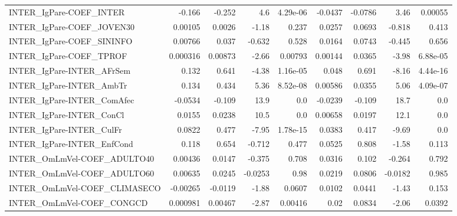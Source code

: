 \begin{tabular}{lrrrrrrrr}
INTER\_IgPare-COEF\_INTER                &      -0.166 &       -0.252 &      4.6 & 4.29e-06 &    -0.0437 &     -0.0786 &         3.46 &       0.00055 \\
INTER\_IgPare-COEF\_JOVEN30              &     0.00105 &       0.0026 &    -1.18 &    0.237 &     0.0257 &      0.0693 &       -0.818 &         0.413 \\
INTER\_IgPare-COEF\_SININFO              &     0.00766 &        0.037 &   -0.632 &    0.528 &     0.0164 &      0.0743 &       -0.445 &         0.656 \\
INTER\_IgPare-COEF\_TPROF                &    0.000316 &      0.00873 &    -2.66 &  0.00793 &    0.00144 &      0.0365 &        -3.98 &      6.88e-05 \\
INTER\_IgPare-INTER\_AFrSem              &       0.132 &        0.641 &    -4.38 & 1.16e-05 &      0.048 &       0.691 &        -8.16 &      4.44e-16 \\
INTER\_IgPare-INTER\_AmbTr               &       0.134 &        0.434 &     5.36 & 8.52e-08 &    0.00586 &      0.0355 &         5.06 &      4.09e-07 \\
INTER\_IgPare-INTER\_ComAfec             &     -0.0534 &       -0.109 &     13.9 &      0.0 &    -0.0239 &      -0.109 &         18.7 &           0.0 \\
INTER\_IgPare-INTER\_ConCl               &      0.0155 &       0.0238 &     10.5 &      0.0 &    0.00658 &      0.0197 &         12.1 &           0.0 \\
INTER\_IgPare-INTER\_CulFr               &      0.0822 &        0.477 &    -7.95 & 1.78e-15 &     0.0383 &       0.417 &        -9.69 &           0.0 \\
INTER\_IgPare-INTER\_EnfCond             &       0.118 &        0.654 &   -0.712 &    0.477 &     0.0525 &       0.808 &        -1.58 &         0.113 \\
INTER\_OmLmVel-COEF\_ADULTO40            &     0.00436 &       0.0147 &   -0.375 &    0.708 &     0.0316 &       0.102 &       -0.264 &         0.792 \\
INTER\_OmLmVel-COEF\_ADULTO60            &     0.00635 &       0.0245 &  -0.0253 &     0.98 &     0.0219 &      0.0806 &      -0.0182 &         0.985 \\
INTER\_OmLmVel-COEF\_CLIMASECO           &    -0.00265 &      -0.0119 &    -1.88 &   0.0607 &     0.0102 &      0.0441 &        -1.43 &         0.153 \\
INTER\_OmLmVel-COEF\_CONGCD              &    0.000981 &      0.00467 &    -2.87 &  0.00416 &       0.02 &      0.0834 &        -2.06 &        0.0392 \\

\end{tabular}

